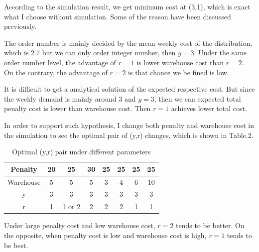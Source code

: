 \documentclass[letterpaper, 10 pt, conference]{ieeeconf}
\begin{document}
According to the simulation result, we get minimum cost at (3,1), which is exact what I choose without simulation. Some of the reason have been discussed previously.


The order number is mainly decided by the mean weekly cost of the distribution, which is 2.7 but we can only order integer number, then $y=3$. Under the same order number level, the advantage of $r=1$ is lower warehouse cost than $r=2$. On the contrary, the advantage of $r=2$ is that chance we be fined is low.


It is difficult to get a analytical solution of the expected respective cost. But since the weekly demand is mainly around 3 and $y=3$, then we can expected total penalty cost is lower than warehouse cost. Then $r=1$ achieves lower total cost.


In order to support such hypothesis, I change both penalty and warehouse cost in the simulation to see the optimal pair of (y,r) changes, which is shown in Table.2.


\begin{table}[h]
  \caption{Optimal (y,r) pair under different parameters}
  \label{table_example}
  \begin{center}
    \begin{tabular}{|c||c|c|c|c|c|c|c|}
      \hline
      Penalty   & 20 & 25 & 30 & 25 & 25 & 25 & 25\\
      \hline
      Warehouse & 5 & 5 & 5 & 3 & 4 & 6 & 10\\
      \hline
      y         & 3 & 3 & 3 & 3 & 3 & 3 & 3\\
      \hline
      r         & 1 & 1 or 2 & 2 & 2 & 2 & 1 & 1\\
      \hline
    \end{tabular}
  \end{center}
\end{table}
Under large penalty cost and low warehouse cost, $r=2$ tends to be better. On the opposite, when penalty cost is low and warehouse cost is high, $r=1$ tends to be best.
\end{document}
